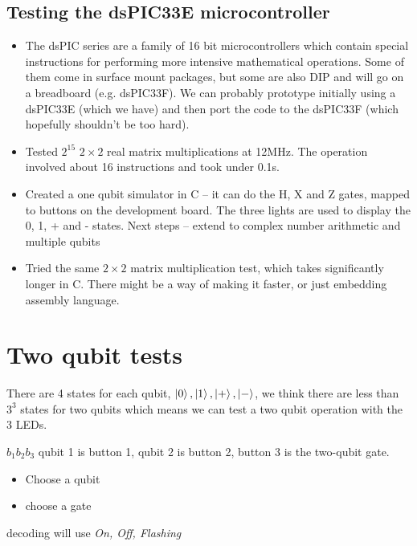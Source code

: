 \documentclass{article}
\begin{document}

\subsection{Testing the dsPIC33E microcontroller}

\begin{itemize}
\item The dsPIC series are a family of 16 bit microcontrollers which contain special instructions for performing more intensive mathematical operations. Some of them come in surface mount packages, but some are also DIP and will go on a breadboard (e.g. dsPIC33F). We can probably prototype initially using a dsPIC33E (which we have) and then port the code to the dsPIC33F (which hopefully shouldn't be too hard).
\item Tested $2^{15}$ $2\times 2$ real matrix multiplications at 12MHz. The operation involved about 16 instructions and took under 0.1s.
\item Created a one qubit simulator in C -- it can do the H, X and Z gates, mapped to buttons on the development board. The three lights are used to display the 0, 1, + and - states. Next steps -- extend to complex number arithmetic and multiple qubits
\item Tried the same $2\times 2$ matrix multiplication test, which takes significantly longer in C. There might be a way of making it faster, or just embedding assembly language.
\end{itemize}

\section{Two qubit tests}

There are 4 states for each qubit, $\ket{0}, \ket{1}, \ket{+}, \ket{-}$, we think there
are less than $3^3$ states for two qubits which means we can test a two qubit operation
with the 3 LEDs.

$ b_1 b_2 b_3$
qubit 1 is button 1, qubit 2 is button 2, button 3 is the two-qubit gate.

\begin{itemize}
    \item Choose a qubit
    \item choose a gate
\end{itemize}

decoding will use \textit{On, Off, Flashing} 
\end{document}
